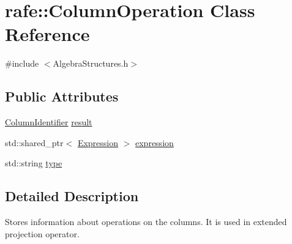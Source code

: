 \hypertarget{classrafe_1_1_column_operation}{\section{rafe\+:\+:Column\+Operation Class Reference}
\label{classrafe_1_1_column_operation}
}


{\ttfamily \#include $<$Algebra\+Structures.\+h$>$}

\subsection*{Public Attributes}
\begin{DoxyCompactItemize}
\item 
\hyperlink{classrafe_1_1_column_identifier}{Column\+Identifier} \hyperlink{classrafe_1_1_column_operation_a728c264bef7363a5bf0578c49654ea3b}{result}
\item 
std\+::shared\+\_\+ptr$<$ \hyperlink{classrafe_1_1_expression}{Expression} $>$ \hyperlink{classrafe_1_1_column_operation_a33bfeb4554709f96d9945cb2148f095b}{expression}
\item 
std\+::string \hyperlink{classrafe_1_1_column_operation_a1c85fd1a1f9465b33553cbdd6e641a51}{type}
\end{DoxyCompactItemize}


\subsection{Detailed Description}
Stores information about operations on the columns. It is used in extended projection operator. 


